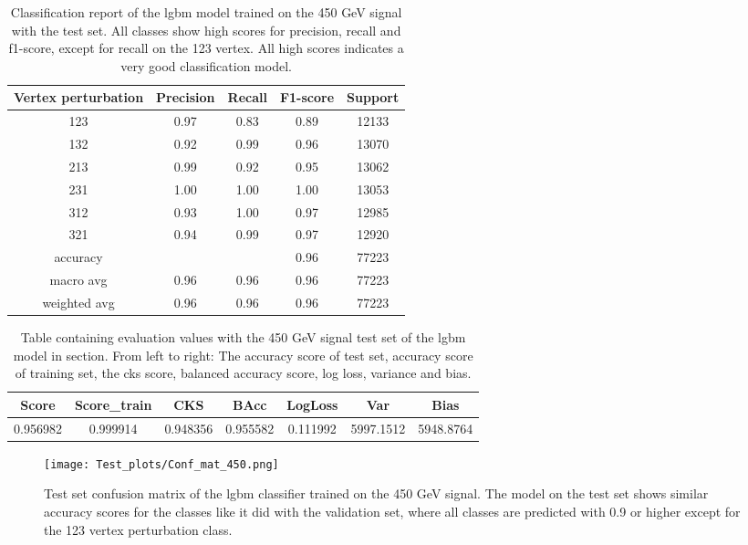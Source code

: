 \documentclass[a4paper, american, 12pt]{report}
\begin{document}
	\begin{table}[ht!]
		\centering
		\begin{tabular}{ |c|c|c|c|c| }
			\hline \rule{0pt}{13pt}
			Vertex perturbation & Precision & Recall & F1-score & Support \\
			\hline \rule{0pt}{13pt}
			123 & 0.97 & 0.83 & 0.89 & 12133 \\
			\hline \rule{0pt}{13pt}
			132 & 0.92 & 0.99 & 0.96 & 13070 \\
			\hline \rule{0pt}{13pt}
			213 & 0.99 & 0.92 & 0.95 & 13062 \\
			\hline \rule{0pt}{13pt}
			231 & 1.00 & 1.00 & 1.00 & 13053  \\
			\hline \rule{0pt}{13pt}
			312 & 0.93 & 1.00 &  0.97 & 12985 \\
			\hline \rule{0pt}{13pt}
			 321 & 0.94 & 0.99 & 0.97 & 12920 \\
			\hline \rule{0pt}{13pt}
			accuracy &   &   &  0.96 & 77223 \\
			\hline \rule{0pt}{13pt}
			macro avg & 0.96  & 0.96 & 0.96 & 77223 \\
			\hline \rule{0pt}{13pt}
			weighted avg & 0.96 & 0.96 & 0.96 & 77223 \\
			\hline
		\end{tabular}	         
		\caption[Classification report of the \acrshort{lgbm} model trained on the 450 GeV signal.]{Classification report of the \acrshort{lgbm} model trained on the 450 GeV signal with the test set. All classes show high scores for precision, recall and f1-score, except for recall on the 123 vertex. All high scores indicates a very good classification model.}
		\label{tab:ClassReport_450}
	\end{table}
	\begin{table}[htb!]
		\hspace{-0.8cm}
		\begin{tabular}{ |c|c|c|c|c|c|c| }
			\hline \rule{0pt}{13pt}
			Score & Score\_train & CKS & BAcc & LogLoss & Var & Bias \\
			\hline \rule{0pt}{13pt}
			0.956982 & 0.999914 & 0.948356 & 0.955582 &  0.111992 & 5997.1512 & 5948.8764 \\
			\hline
		\end{tabular}	         
		\caption[Evaluation with 450 Gev signal test set.]{Table containing evaluation values with the 450 GeV signal test set of the \acrshort{lgbm} model in section. From left to right: The accuracy score of test set, accuracy score of training set, the \acrshort{cks} score, balanced accuracy score, log loss, variance and bias.}
		\label{tab:Test_450}
	\end{table}
	\begin{figure}[htb!]
		\centering\texttt{[image: Test\_plots/Conf\_mat\_450.png]}
		\caption[Test set confusion matrix for the \acrshort{lgbm} model trained on the 150 GeV signal.]{Test set confusion matrix of the \acrshort{lgbm} classifier trained on the 450 GeV signal. The model on the test set shows similar accuracy scores for the classes like it did with the validation set, where all classes are predicted with 0.9 or higher except for the 123 vertex perturbation class. \label{fig:ConfTest_450}}
	\end{figure}
\end{document}

